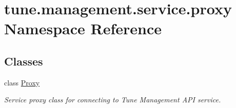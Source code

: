 \hypertarget{namespacetune_1_1management_1_1service_1_1proxy}{\section{tune.\-management.\-service.\-proxy Namespace Reference}
\label{namespacetune_1_1management_1_1service_1_1proxy}
}
\subsection*{Classes}
\begin{DoxyCompactItemize}
\item 
class \hyperlink{classtune_1_1management_1_1service_1_1proxy_1_1Proxy}{Proxy}
\begin{DoxyCompactList}\small\item\em Service proxy class for connecting to Tune Management A\-P\-I service. \end{DoxyCompactList}\end{DoxyCompactItemize}
